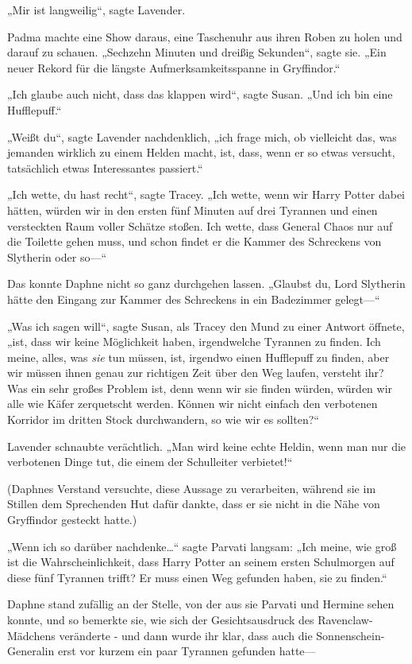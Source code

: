 {„Mir ist langweilig“, sagte Lavender.

Padma machte eine Show daraus, eine Taschenuhr aus ihren Roben zu holen und darauf zu schauen. „Sechzehn Minuten und dreißig Sekunden“, sagte sie. „Ein neuer Rekord für die längste Aufmerksamkeitsspanne in Gryffindor.“

„Ich glaube auch nicht, dass das klappen wird“, sagte Susan. „Und ich bin eine Hufflepuff.“

„Weißt du“, sagte Lavender nachdenklich, „ich frage mich, ob vielleicht das, was jemanden wirklich zu einem Helden macht, ist, dass, wenn er so etwas versucht, tatsächlich etwas Interessantes passiert.“

„Ich wette, du hast recht“, sagte Tracey. „Ich wette, wenn wir Harry Potter dabei hätten, würden wir in den ersten fünf Minuten auf drei Tyrannen und einen versteckten Raum voller Schätze stoßen. Ich wette, dass General Chaos nur auf die Toilette gehen muss, und schon findet er die Kammer des Schreckens von Slytherin oder so—“

Das konnte Daphne nicht so ganz durchgehen lassen. „Glaubst du, Lord Slytherin hätte den Eingang zur Kammer des Schreckens in ein Badezimmer gelegt—“

„Was ich sagen will“, sagte Susan, als Tracey den Mund zu einer Antwort öffnete, „ist, dass wir keine Möglichkeit haben, irgendwelche Tyrannen zu finden. Ich meine, alles, was \emph{sie} tun müssen, ist, irgendwo einen Hufflepuff zu finden, aber wir müssen ihnen genau zur richtigen Zeit über den Weg laufen, versteht ihr? Was ein sehr großes Problem ist, denn wenn wir sie finden würden, würden wir alle wie Käfer zerquetscht werden. Können wir nicht einfach den verbotenen Korridor im dritten Stock durchwandern, so wie wir es sollten?“

Lavender schnaubte verächtlich. „Man wird keine echte Heldin, wenn man nur die verbotenen Dinge tut, die einem der Schulleiter verbietet!“

(Daphnes Verstand versuchte, diese Aussage zu verarbeiten, während sie im Stillen dem Sprechenden Hut dafür dankte, dass er sie nicht in die Nähe von Gryffindor gesteckt hatte.)

„Wenn ich so darüber nachdenke…“ sagte Parvati langsam: „Ich meine, wie groß ist die Wahrscheinlichkeit, dass Harry Potter an seinem ersten Schulmorgen auf diese fünf Tyrannen trifft? Er muss einen Weg gefunden haben, sie zu finden.“

Daphne stand zufällig an der Stelle, von der aus sie Parvati und Hermine sehen konnte, und so bemerkte sie, wie sich der Gesichtsausdruck des Ravenclaw-Mädchens veränderte - und dann wurde ihr klar, dass auch die Sonnenschein-Generalin erst vor kurzem ein paar Tyrannen gefunden hatte—

}
